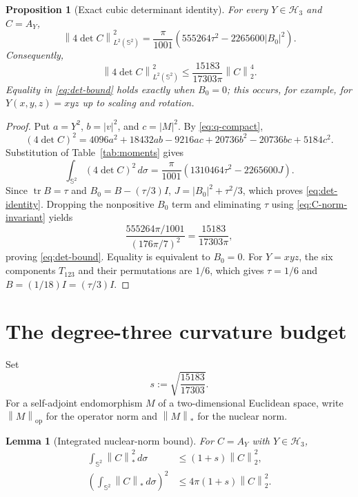 \documentclass[11pt,reqno]{amsart}
\newtheorem{lemma}[theorem]{Lemma}
\newtheorem{proposition}[theorem]{Proposition}
\theoremstyle{remark}
\newcommand{\Sph}{\mathbb S^2}
\newcommand{\Harm}{\mathcal H}
\newcommand{\tr}{\operatorname{tr}}
\newcommand{\op}{\mathrm{op}}
\newcommand{\nuc}{*}
\newcommand{\dd}{\,d\sigma}
\newcommand{\norm}[1]{\left\lVert #1\right\rVert}
\newcommand{\abs}[1]{\left\lvert #1\right\rvert}
\begin{document}
\begin{proposition}[Exact cubic determinant identity]\label{prop:det-identity}
For every $Y\in\Harm_3$ and $C=A_Y$,
\begin{equation}\label{eq:det-identity}
 \norm{4\det C}_{L^2(\Sph)}^2
 =\frac{\pi}{1001}
  \left(555264\tau^2-2265600\abs{B_0}^2\right).
\end{equation}
Consequently,
\begin{equation}\label{eq:det-bound}
 \norm{4\det C}_{L^2(\Sph)}^2
 \le \frac{15183}{17303\pi}\norm{C}_2^4.
\end{equation}
Equality in \eqref{eq:det-bound} holds exactly when $B_0=0$; this occurs, for
example, for $Y(x,y,z)=xyz$ up to scaling and rotation.
\end{proposition}

\begin{proof}
Put $a=Y^2$, $b=\abs{v}^2$, and $c=\abs{M}^2$. By
\eqref{eq:q-compact},
\[
 (4\det C)^2
 =4096a^2+18432ab-9216ac+20736b^2-20736bc+5184c^2.
\]
Substitution of Table~\ref{tab:moments} gives
\[
 \int_{\Sph}(4\det C)^2\dd
 =\frac{\pi}{1001}\left(1310464\tau^2-2265600J\right).
\]
Since $\tr B=\tau$ and $B_0=B-(\tau/3)I$,
$J=\abs{B_0}^2+\tau^2/3$, which proves \eqref{eq:det-identity}.
Dropping the nonpositive $B_0$ term and eliminating $\tau$ using
\eqref{eq:C-norm-invariant} yields
\[
 \frac{555264\pi/1001}{(176\pi/7)^2}
 =\frac{15183}{17303\pi},
\]
proving \eqref{eq:det-bound}. Equality is equivalent to $B_0=0$. For
$Y=xyz$, the six components $T_{123}$ and their permutations are $1/6$,
which gives $\tau=1/6$ and $B=(1/18)I=(\tau/3)I$.
\end{proof}

\section{The degree-three curvature budget}

Set
\[
 s:=\sqrt{\frac{15183}{17303}}.
\]
For a self-adjoint endomorphism $M$ of a two-dimensional Euclidean space,
write $\norm{M}_{\op}$ for the operator norm and $\norm{M}_{\nuc}$ for the
nuclear norm.

\begin{lemma}[Integrated nuclear-norm bound]\label{lem:nuclear}
For $C=A_Y$ with $Y\in\Harm_3$,
\begin{align}
 \int_{\Sph}\norm{C}_{\nuc}^2\dd&\le(1+s)\norm{C}_2^2,
 \label{eq:nuclear2}\\
 \left(\int_{\Sph}\norm{C}_{\nuc}\dd\right)^2
 &\le4\pi(1+s)\norm{C}_2^2.
 \label{eq:nuclear1}
\end{align}
\end{lemma}
\end{document}
